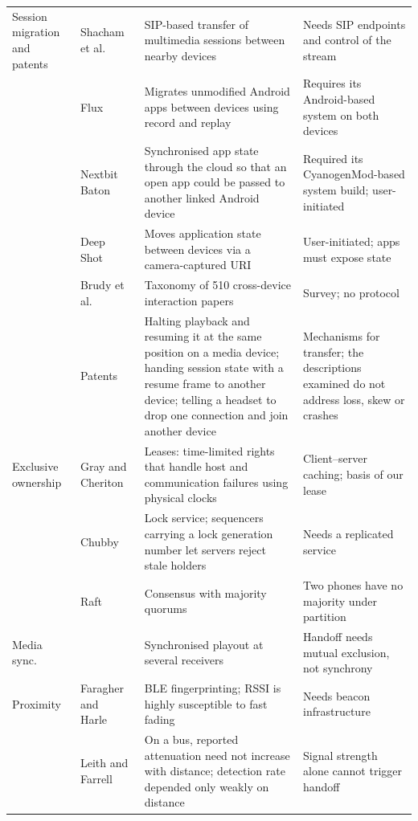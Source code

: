 \documentclass[conference]{IEEEtran}
\begin{document}
\begin{table}[t]
\begin{tabularx}{\textwidth}{@{}L{2.2cm}L{3.4cm}YY@{}}
\midrule
Session migration and patents & Shacham et al.~\cite{shacham2007,rfc5631} & SIP-based transfer of multimedia sessions between nearby devices & Needs SIP endpoints and control of the stream \\
 & Flux~\cite{flux2015} & Migrates unmodified Android apps between devices using record and replay & Requires its Android-based system on both devices \\
 & Nextbit Baton~\cite{baton2014} & Synchronised app state through the cloud so that an open app could be passed to another linked Android device & Required its CyanogenMod-based system build; user-initiated \\
 & Deep Shot~\cite{deepshot2011} & Moves application state between devices via a camera-captured URI & User-initiated; apps must expose state \\
 & Brudy et al.~\cite{brudy2019} & Taxonomy of 510 cross-device interaction papers & Survey; no protocol \\
 & Patents~\cite{arora2015,zhang2006,trip2018} & Halting playback and resuming it at the same position on a media device; handing session state with a resume frame to another device; telling a headset to drop one connection and join another device & Mechanisms for transfer; the descriptions examined do not address loss, skew or crashes \\
\midrule
Exclusive ownership & Gray and Cheriton~\cite{gray1989} & Leases: time-limited rights that handle host and communication failures using physical clocks & Client--server caching; basis of our lease \\
 & Chubby~\cite{chubby2006} & Lock service; sequencers carrying a lock generation number let servers reject stale holders & Needs a replicated service \\
 & Raft~\cite{raft2014} & Consensus with majority quorums & Two phones have no majority under partition \\
\midrule
Media sync. & \cite{montagud2012,rfc7272} & Synchronised playout at several receivers & Handoff needs mutual exclusion, not synchrony \\
\midrule
Proximity & Faragher and Harle~\cite{faragher2015} & BLE fingerprinting; RSSI is highly susceptible to fast fading & Needs beacon infrastructure \\
 & Leith and Farrell~\cite{leith2020} & On a bus, reported attenuation need not increase with distance; detection rate depended only weakly on distance & Signal strength alone cannot trigger handoff \\
\bottomrule
\end{tabularx}
\end{table}
\end{document}
